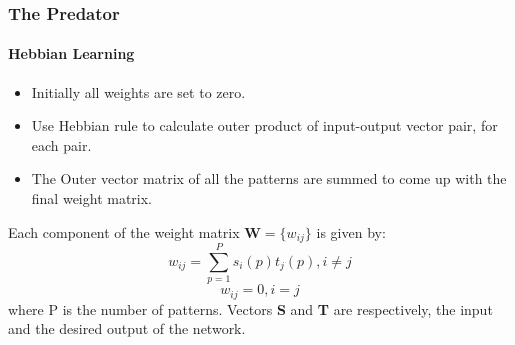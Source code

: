 \frame
{
	\frametitle{The Predator}
	\framesubtitle{Hebbian Learning}

	\begin{itemize}
		\item Initially all weights are set to zero.
		\item Use Hebbian rule to calculate outer product of input-output vector pair, for each pair.
		\item The Outer vector matrix of all the patterns are summed to come up with the final weight matrix.
	\end{itemize}
	
Each component of the weight matrix \(\textbf{W} = \{w_{ij}\}\) is given by:
\begin{equation}
w_{ij} = \sum_{p=1}^{P} s_i(p) t_j(p), i \neq j
\end{equation}
\[
w_{ij} = 0, i = j
\]
where P is the number of patterns. Vectors \textbf{S} and \textbf{T} are respectively, the input and the desired output of the network.

}